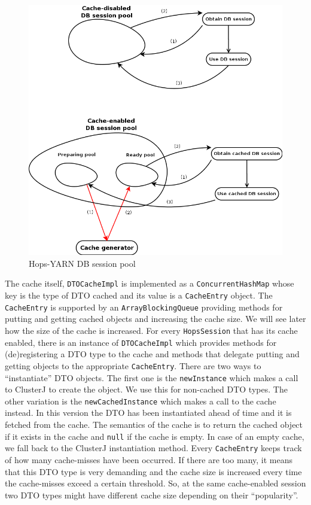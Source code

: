 \begin{figure}
\centering
\includegraphics[scale=0.4]{resources/images/Implementation/db_session_pools.png}
\caption{Hops-YARN DB session pool}
\label{fig:impl_dto_session_arch}
\end{figure}

The cache itself, \texttt{DTOCacheImpl} is implemented as a \texttt{ConcurrentHashMap} whose
key is the type of DTO cached and its value is a \texttt{CacheEntry}
object. The \texttt{CacheEntry} is supported by an
\texttt{ArrayBlockingQueue} providing methods for putting and getting
cached objects and increasing the cache size. We will see later how
the size of the cache is increased. For every \texttt{HopsSession}
that has its cache enabled, there is an instance of
\texttt{DTOCacheImpl} which provides methods for (de)registering a DTO
type to the cache and methods that delegate putting and getting objects to the
appropriate \texttt{CacheEntry}. There are
two ways to ``instantiate'' DTO objects. The first one is the
\texttt{newInstance} which makes a call to ClusterJ to create the
object. We use this for non-cached DTO types. The other variation is
the \texttt{newCachedInstance} which makes a call to the cache
instead. In this version the DTO has been instantiated
ahead of time and it is fetched from the cache. The semantics of the
cache is to return the cached object if
it exists in the cache and \texttt{null} if the cache is empty. In
case of an empty cache, we fall back to the ClusterJ instantiation
method. Every \texttt{CacheEntry} keeps track of how many cache-misses
have been occurred. If there are too many, it means that this DTO type
is very demanding and the cache size is increased every time the
cache-misses exceed a certain threshold. So, at the same cache-enabled
session two DTO types might have different cache size depending on
their ``popularity''.

